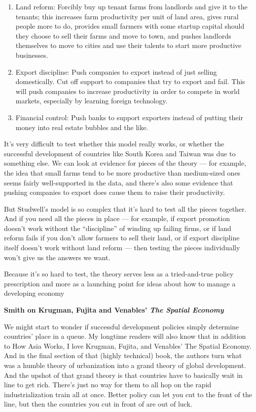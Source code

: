 \documentclass[
]{book}
\begin{document}
\begin{enumerate}
\def\labelenumi{\arabic{enumi}.}
\item
  Land reform: Forcibly buy up tenant farms from landlords and give it to the tenants; this increases farm productivity per unit of land area, gives rural people more to do, provides small farmers with some startup capital should they choose to sell their farms and move to town, and pushes landlords themselves to move to cities and use their talents to start more productive businesses.
\item
  Export discipline: Push companies to export instead of just selling domestically. Cut off support to companies that try to export and fail. This will push companies to increase productivity in order to compete in world markets, especially by learning foreign technology.
\item
  Financial control: Push banks to support exporters instead of putting their money into real estate bubbles and the like.
\end{enumerate}

It's very difficult to test whether this model really works, or whether the successful development of countries like South Korea and Taiwan was due to something else. We can look at evidence for pieces of the theory --- for example, the idea that small farms tend to be more productive than medium-sized ones seems fairly well-supported in the data, and there's also some evidence that pushing companies to export does cause them to raise their productivity.

But Studwell's model is so complex that it's hard to test all the pieces together. And if you need all the pieces in place --- for example, if export promotion doesn't work without the ``discipline'' of winding up failing firms, or if land reform fails if you don't allow farmers to sell their land, or if export discipline itself doesn't work without land reform --- then testing the pieces individually won't give us the answers we want.

Because it's so hard to test, the theory serves less as a tried-and-true policy prescription and more as a launching point for ideas about how to manage a developing economy

\textbf{Smith on Krugman, Fujita and Venables' \emph{The Spatial Economy} }

We might start to wonder if successful development policies simply determine countries' place in a queue. My longtime readers will also know that in addition to How Asia Works, I love Krugman, Fujita, and Venables' The Spatial Economy. And in the final section of that (highly technical) book, the authors turn what was a humble theory of urbanization into a grand theory of global development. And the upshot of that grand theory is that countries have to basically wait in line to get rich. There's just no way for them to all hop on the rapid industrialization train all at once. Better policy can let you cut to the front of the line, but then the countries you cut in front of are out of luck.
\end{document}
